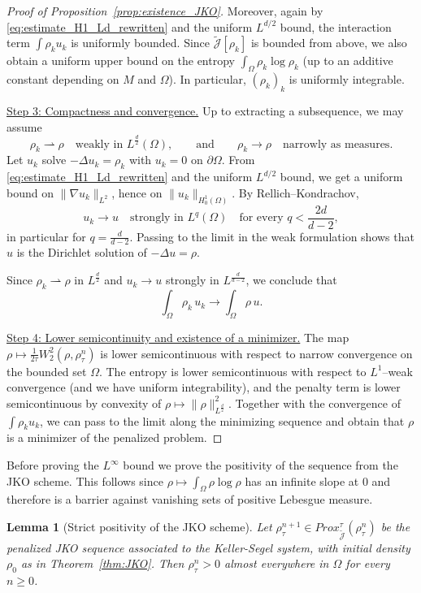 \documentclass[a4paper,twosided, 11pt]{article}
\theoremstyle{plain}
\newtheorem{lemma}[thm]{Lemma}
\theoremstyle{remark}
\numberwithin{equation}{section}
\begin{document}
{\begin{proof}[Proof of Proposition~\ref{prop:existence_JKO}]
Moreover, again by \eqref{eq:estimate_H1_Ld_rewritten} and the uniform $L^{d/2}$ bound, the
interaction term $\int\rho_k u_k$ is uniformly bounded. Since $\widetilde{\mathcal{J}}[\rho_k]$
is bounded from above, we also obtain a uniform upper bound on the entropy
$\int_\Omega \rho_k\log\rho_k$ (up to an additive constant depending on $M$ and $\Omega$).
In particular, $(\rho_k)_k$ is uniformly integrable.

\medskip

\underline{Step 3: Compactness and convergence.}
Up to extracting a subsequence, we may assume
\[
\rho_k \rightharpoonup \rho \quad\text{weakly in }L^{\frac d2}(\Omega),
\qquad\text{and}\qquad
\rho_k \to \rho \quad\text{narrowly as measures.}
\]
Let $u_k$ solve $-\Delta u_k=\rho_k$ with $u_k=0$ on $\partial\Omega$.
From \eqref{eq:estimate_H1_Ld_rewritten} and the uniform $L^{d/2}$ bound, we get a uniform bound
on $\|\nabla u_k\|_{L^2}$, hence on $\|u_k\|_{H_0^1(\Omega)}$.
By Rellich--Kondrachov,
\[
u_k \to u \quad\text{strongly in }L^q(\Omega)\quad\text{for every }q<\frac{2d}{d-2},
\]
in particular for $q=\frac{d}{d-2}$.
Passing to the limit in the weak formulation shows that $u$ is the Dirichlet solution of
$-\Delta u=\rho$.

Since $\rho_k\rightharpoonup\rho$ in $L^{\frac d2}$ and $u_k\to u$ strongly in
$L^{\frac{d}{d-2}}$, we conclude that
\[
\int_\Omega \rho_k\,u_k  \longrightarrow  \int_\Omega \rho\,u.
\]


\medskip

\underline{Step 4: Lower semicontinuity and existence of a minimizer.}
The map $\rho\mapsto \frac1{2\tau}W_2^2(\rho,\rho_\tau^n)$ is lower semicontinuous
with respect to narrow convergence on the bounded set $\Omega$.
The entropy is lower semicontinuous with respect to $L^1$--weak convergence (and we have uniform
integrability), and the penalty term is lower semicontinuous by convexity of
$\rho\mapsto \|\rho\|_{L^{\frac d2}}^2$.
Together with the convergence of $\int\rho_k u_k$, we can pass to the limit along the minimizing
sequence and obtain that $\rho$ is a minimizer of the penalized problem.
\end{proof}


Before proving the $L^{\infty}$ bound we prove the positivity of the sequence from the JKO scheme. This follows since $\rho\mapsto\int_{\Omega}\rho\log\rho$  has an infinite slope at 0 and therefore is a barrier against vanishing sets of positive Lebesgue measure.


\begin{lemma}[Strict positivity of the JKO scheme]\label{lem:strict_positivy}
Let $\rho^{n+1}_{\tau}\in Prox_{\widetilde{\mathcal{J}}}^{\tau}(\rho^{n}_{\tau})$ be the penalized JKO sequence
associated to the Keller-Segel system, with initial density $\rho_0$ as in Theorem~\ref{thm:JKO}.
Then $\rho^n_\tau>0$ almost everywhere in $\Omega$ for every $n\ge 0$.
\end{lemma}

}
\end{document}
